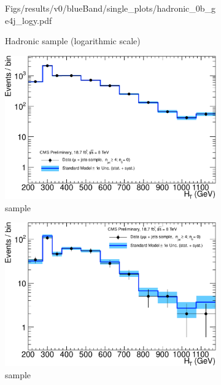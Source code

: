\begin{figure}[h!]
\begin{subfigure}[b]{0.48\textwidth}
    {Figs/results/v0/blueBand/single_plots/hadronic_0b_ge4j_logy.pdf}
    \caption{Hadronic sample (logarithmic scale)}
  \end{subfigure}
  \begin{subfigure}[b]{0.48\textwidth}
    \includegraphics[width=\textwidth]
    {Figs/results/v0/blueBand/single_plots/muon_0b_ge4j_logy.pdf}
    \caption{\mj sample}
  \end{subfigure}
  \begin{subfigure}[b]{0.48\textwidth}
    \includegraphics[width=\textwidth]
    {Figs/results/v0/blueBand/single_plots/mumu_0b_ge4j_logy.pdf}
    \caption{\mmj sample}
  \end{subfigure}\\
  \begin{subfigure}[b]{0.48\textwidth}

\end{subfigure}
\end{figure}
